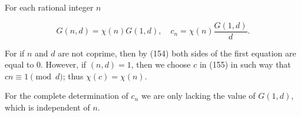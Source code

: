 For each rational integer $n$

$$G(n, d) = \chi(n)G(1, d), \quad c_n = \chi(n) \frac{G(1, d)}{d}.$$

For if $n$ and $d$ are not coprime, then by (154) both sides of the first equation are equal to 0. However, if $(n, d) = 1$, then we choose $c$ in (155) in such way that $cn \equiv 1 \pmod{d}$; thus $\chi(c) = \chi(n)$.

For the complete determination of $c_n$ we are only lacking the value of $G(1, d)$, which is independent of $n$.

